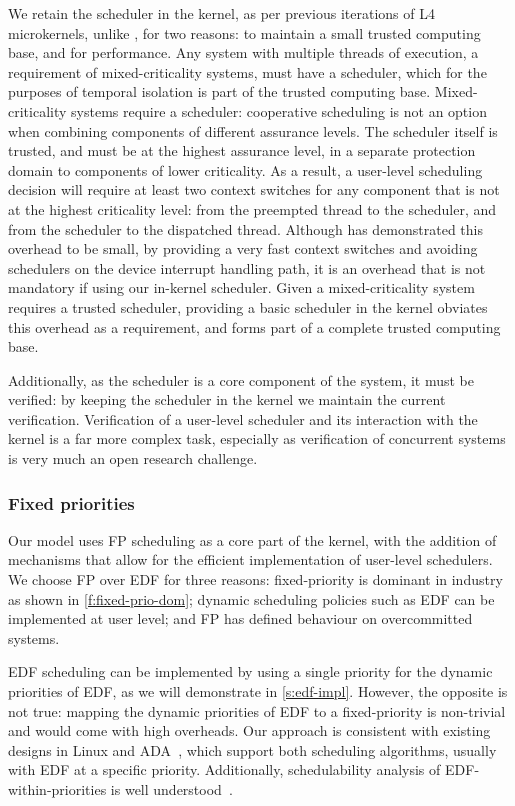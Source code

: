 We retain the scheduler in the kernel, as per previous iterations of L4 microkernels, 
unlike \composite, for two reasons: to
maintain a small trusted computing base, and for performance. Any system with
multiple threads of execution, a requirement of mixed-criticality systems,
must have a scheduler, which for the purposes of temporal isolation is part of
the trusted computing base. Mixed-criticality systems require a scheduler: cooperative scheduling is
not an option when combining components of different assurance levels. The scheduler itself is
trusted, and must be at the highest assurance level, in a separate protection domain to components
of lower criticality.
As a result, a user-level scheduling decision will require at least two context switches for any
component that is not at the highest criticality level:
from the preempted thread to the scheduler, and from the scheduler to the dispatched
thread. Although \composite has demonstrated this overhead to be small, by providing a very fast
context switches and avoiding schedulers on the device interrupt handling path, it is an overhead
that is not mandatory if using our in-kernel scheduler. 
Given a mixed-criticality system requires a trusted scheduler, providing a basic scheduler in the kernel 
obviates this overhead as a requirement, and forms part of a complete trusted computing base.

Additionally, as the scheduler is a core component of the system, it must be
verified: by keeping the
scheduler in the kernel we maintain the current verification. Verification of a user-level scheduler
and its interaction with the kernel is a far more complex task, especially as verification of
concurrent systems is very much an open research challenge. 

\subsubsection{Fixed priorities}

Our model uses \gls{FP} scheduling as a core part of the kernel, with the addition of mechanisms
that allow for the efficient implementation of user-level schedulers.
We choose \gls{FP} over \gls{EDF} for three reasons: 
fixed-priority is dominant in industry
as shown in \cref{f:fixed-prio-dom}; dynamic scheduling policies such as
\gls{EDF} can be implemented at user level; and \gls{FP} has defined behaviour on overcommitted
systems.

\gls{EDF} scheduling can be implemented by using a single priority for the dynamic
priorities of \gls{EDF}, as we will demonstrate in \cref{s:edf-impl}.
However, the opposite is not true: mapping the dynamic priorities of EDF to a fixed-priority
is non-trivial and would come with high overheads. 
Our approach is consistent with existing designs in Linux  and ADA~\citep{Burns_Wellings:crtpa}, which
support both scheduling algorithms, usually with \gls{EDF} at a specific priority. Additionally,
schedulability analysis of \gls{EDF}-within-priorities is well
understood~\citep{Harbour_Palencia_03}.

